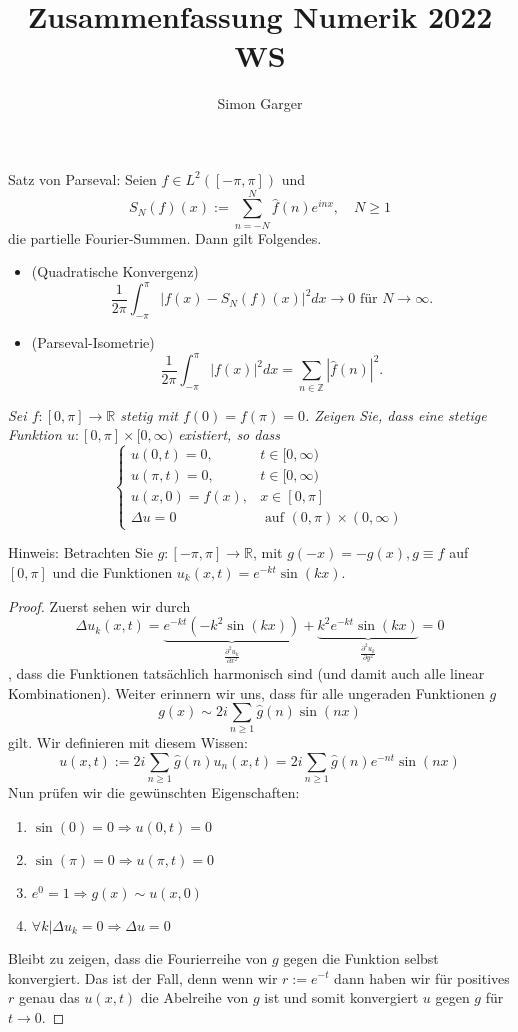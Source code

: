 \documentclass[11pt]{article}
\title{Zusammenfassung Numerik 2022 WS}
\author{Simon Garger}
\newenvironment{problem}[2][Beispiel]{
    \begin{trivlist}
        \item[\hskip \labelsep {\bfseries #1}\hskip \labelsep {\bfseries #2.}] \itshape}{
    \end{trivlist}\normalshape
}
\begin{document}
    Satz von Parseval: Seien $f \in L^2([-\pi, \pi])$ und
    $$
    S_N(f)(x):=\sum_{n=-N}^N \hat{f}(n) e^{i n x}, \quad N \geq 1
    $$
    die partielle Fourier-Summen. Dann gilt Folgendes.
    \begin{itemize}
        \item (Quadratische Konvergenz)
        $$
        \frac{1}{2 \pi} \int_{-\pi}^\pi\left|f(x)-S_N(f)(x)\right|^2 d x \longrightarrow 0 \text { für } N \rightarrow \infty .
        $$
        \item (Parseval-Isometrie)
        $$
        \frac{1}{2 \pi} \int_{-\pi}^\pi|f(x)|^2 d x=\sum_{n \in \mathbb{Z}}|\hat{f}(n)|^2 .
        $$
    \end{itemize}

    \begin{problem}{1}
        Sei $f:[0, \pi] \rightarrow \mathbb{R}$ stetig mit $f(0)=f(\pi)=0$. Zeigen Sie, dass eine
        stetige Funktion $u:[0, \pi] \times[0, \infty)$ existiert, so dass
        $$
        \begin{cases}u(0, t)=0, & t \in[0, \infty) \\ u(\pi, t)=0, & t \in[0, \infty) \\ u(x, 0)=f(x),
        & x \in[0, \pi] \\ \Delta u=0 & \text { auf }(0, \pi) \times(0, \infty)\end{cases}
        $$

        Hinweis: Betrachten Sie $g:[-\pi, \pi] \rightarrow \mathbb{R}$, mit $g(-x)=-g(x), g \equiv f$
        auf $[0, \pi]$ und die Funktionen $u_k(x, t)=e^{-k t} \sin (k x)$.
    \end{problem}

    \begin{proof}
        Zuerst sehen wir durch
        $$\Delta u_k(x,t) = \underbrace{e^{-kt}(-k^2\sin(kx))}_{\frac{\partial^2 u_k}{\partial x^2}}
        + \underbrace{k^2e^{-kt}\sin(kx)}_{\frac{\partial^2 u_k}{\partial y^2}}=0$$
        , dass die Funktionen tatsächlich harmonisch sind (und damit auch alle linear Kombinationen).
        Weiter erinnern wir uns, dass für alle ungeraden Funktionen $g$
        $$g(x)\sim 2i\sum_{n\geq 1}\hat{g}(n)\sin(nx)$$
        gilt. Wir definieren mit diesem Wissen:
        $$u(x,t):=2i\sum_{n\geq 1}\hat{g}(n) u_n(x,t)=2i\sum_{n\geq 1}\hat{g}(n) e^{-nt}\sin(nx)$$
        Nun prüfen wir die gewünschten Eigenschaften:
        \begin{enumerate}[label = (\roman{enumi})]
            \item $\sin(0)=0\Rightarrow u(0,t)=0$
            \item $\sin(\pi)=0\Rightarrow u(\pi,t)=0$
            \item $e^{0}=1\Rightarrow g(x)\sim u(x,0)$
            \item $\forall k|\Delta u_k=0\Rightarrow \Delta u=0$
        \end{enumerate}
        Bleibt zu zeigen, dass die Fourierreihe von $g$ gegen die Funktion selbst konvergiert.
        Das ist der Fall, denn wenn wir $r:=e^{-t}$ dann haben wir für positives $r$ genau das
        $u(x,t)$ die Abelreihe von $g$ ist und somit konvergiert $u$ gegen $g$ für $t\to 0$.
    \end{proof}
\end{document}

